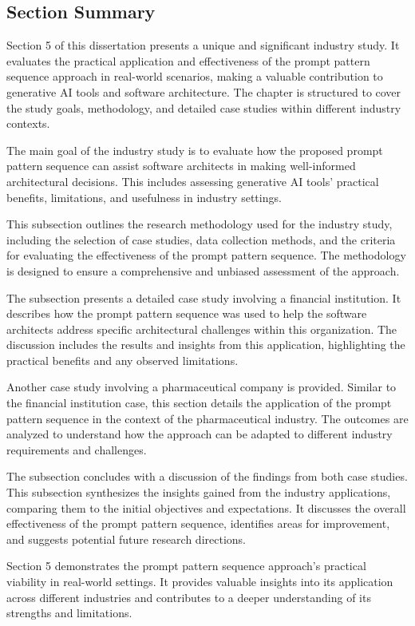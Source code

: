 \subsection{Section Summary}
Section 5 of this dissertation presents a unique and significant industry study. It evaluates the practical application and effectiveness of the prompt pattern sequence approach in real-world scenarios, making a valuable contribution to generative AI tools and software architecture. The chapter is structured to cover the study goals, methodology, and detailed case studies within different industry contexts.


The main goal of the industry study is to evaluate how the proposed prompt pattern sequence can assist software architects in making well-informed architectural decisions. This includes assessing generative AI tools' practical benefits, limitations, and usefulness in industry settings.

This subsection outlines the research methodology used for the industry study, including the selection of case studies, data collection methods, and the criteria for evaluating the effectiveness of the prompt pattern sequence. The methodology is designed to ensure a comprehensive and unbiased assessment of the approach.

The subsection presents a detailed case study involving a financial institution. It describes how the prompt pattern sequence was used to help the software architects address specific architectural challenges within this organization. The discussion includes the results and insights from this application, highlighting the practical benefits and any observed limitations.

Another case study involving a pharmaceutical company is provided. Similar to the financial institution case, this section details the application of the prompt pattern sequence in the context of the pharmaceutical industry. The outcomes are analyzed to understand how the approach can be adapted to different industry requirements and challenges.

The subsection concludes with a discussion of the findings from both case studies. This subsection synthesizes the insights gained from the industry applications, comparing them to the initial objectives and expectations. It discusses the overall effectiveness of the prompt pattern sequence, identifies areas for improvement, and suggests potential future research directions.

Section 5 demonstrates the prompt pattern sequence approach's practical viability in real-world settings. It provides valuable insights into its application across different industries and contributes to a deeper understanding of its strengths and limitations.
